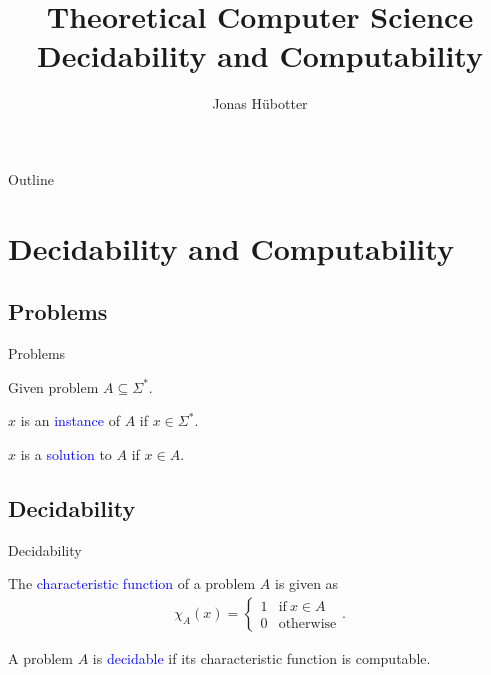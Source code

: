 \documentclass{beamer}
\title[Theoretical Computer Science]{Theoretical Computer Science \\ Decidability and Computability}
\author{Jonas Hübotter}
\date{}
\theoremstyle{definition}
\def\spadding{\vspace{0.25cm}}
\def\b{\textcolor{blue}}
\begin{document}
\begin{frame}
  \titlepage
\end{frame}

\begin{frame}[allowframebreaks]{Outline}
 \tableofcontents[subsubsectionstyle=hide]
\end{frame}

\section{Decidability and Computability}

\subsection{Problems}

\begin{frame}{Problems}

Given problem $A \subseteq \Sigma^*$.\spadding

\begin{definition}
$x$ is an \b{instance} of $A$ if $x \in \Sigma^*$.\par
$x$ is a \b{solution} to $A$ if $x \in A$.
\end{definition}

\end{frame}

\subsection{Decidability}

\begin{frame}{Decidability}

\begin{definition}
The \b{characteristic function} of a problem $A$ is given as
\begin{align*}
    \chi_A(x) = \begin{cases}
                    1 & \text{if}\ x \in A \\
                    0 & \text{otherwise}
                \end{cases}.
\end{align*}
\end{definition}

\begin{definition}
A problem $A$ is \b{decidable} if its characteristic function is computable.
\end{definition}

\end{frame}
\end{document}
